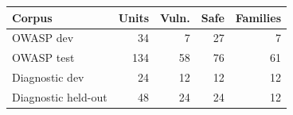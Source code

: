 \begin{tabular}{lrrrr}
\toprule
Corpus & Units & Vuln. & Safe & Families \\
\midrule
OWASP dev & 34 & 7 & 27 & 7 \\
OWASP test & 134 & 58 & 76 & 61 \\
Diagnostic dev & 24 & 12 & 12 & 12 \\
Diagnostic held-out & 48 & 24 & 24 & 12 \\
\bottomrule
\end{tabular}
